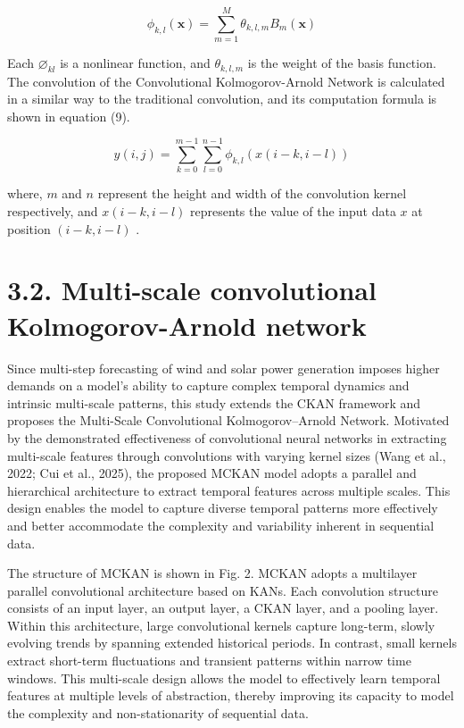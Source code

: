 \documentclass[
  10
]{article}
\begin{document}
\[
\phi_ {k, l} (\boldsymbol {x}) = \sum_ {m = 1} ^ {M} \theta_ {k, l, m} B _ {m} (\boldsymbol {x})
\]

Each \(\varnothing _ { k l }\) is a nonlinear function, and
\(\theta _ { k , l , m }\) is the weight of the basis function. The
convolution of the Convolutional Kolmogorov-Arnold Network is calculated
in a similar way to the traditional convolution, and its computation
formula is shown in equation (9).

\[
y (i, j) = \sum_ {k = 0} ^ {m - 1} \sum_ {l = 0} ^ {n - 1} \phi_ {k, l} (x (i - k, i - l)) \tag {9}
\]

where, \(m\) and \(n\) represent the height and width of the convolution
kernel respectively, and \(x ( i { - } k , i { - } l )\) represents the
value of the input data \(x\) at position \(( i - k , i - l )\) .

\section{3.2. Multi-scale convolutional Kolmogorov-Arnold
network}\label{multi-scale-convolutional-kolmogorov-arnold-network}

Since multi-step forecasting of wind and solar power generation imposes
higher demands on a model's ability to capture complex temporal dynamics
and intrinsic multi-scale patterns, this study extends the CKAN
framework and proposes the Multi-Scale Convolutional Kolmogorov--Arnold
Network. Motivated by the demonstrated effectiveness of convolutional
neural networks in extracting multi-scale features through convolutions
with varying kernel sizes (Wang et al., 2022; Cui et al., 2025), the
proposed MCKAN model adopts a parallel and hierarchical architecture to
extract temporal features across multiple scales. This design enables
the model to capture diverse temporal patterns more effectively and
better accommodate the complexity and variability inherent in sequential
data.

The structure of MCKAN is shown in Fig. 2. MCKAN adopts a multilayer
parallel convolutional architecture based on KANs. Each convolution
structure consists of an input layer, an output layer, a CKAN layer, and
a pooling layer. Within this architecture, large convolutional kernels
capture long-term, slowly evolving trends by spanning extended
historical periods. In contrast, small kernels extract short-term
fluctuations and transient patterns within narrow time windows. This
multi-scale design allows the model to effectively learn temporal
features at multiple levels of abstraction, thereby improving its
capacity to model the complexity and non-stationarity of sequential
data.
\end{document}
